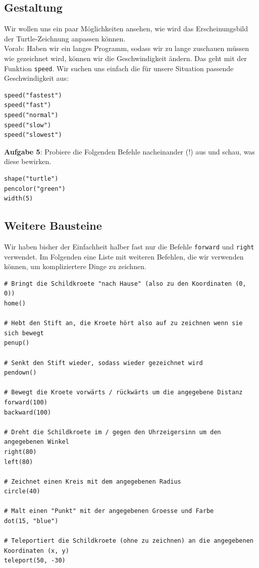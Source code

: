 \documentclass[ngerman,11pt]{article}
\begin{document}
    \subsection{Gestaltung}

    Wir wollen uns ein paar Möglichkeiten ansehen, wie wird das Erscheinungsbild
    der Turtle-Zeichnung anpassen können. \\

    Vorab: Haben wir ein langes Programm, sodass wir zu lange zuschauen müssen wie gezeichnet wird,
    können wir die Geschwindigkeit ändern.
    Das geht mit der Funktion \verb_speed_.
    Wir suchen uns einfach die für unsere Situation passende Geschwindigkeit aus:

    \begin{lstlisting}[caption=Geschwindigkeit ändern]
speed("fastest")
speed("fast")
speed("normal")
speed("slow")
speed("slowest")
    \end{lstlisting}

    \textbf{Aufgabe 5}: Probiere die Folgenden Befehle nacheinander (!) aus und schau, was diese bewirken.

    \begin{lstlisting}[caption=Erscheinungsbild]
shape("turtle")
pencolor("green")
width(5)
    \end{lstlisting}

    \subsection{Weitere Bausteine}

    Wir haben bisher der Einfachheit halber fast nur die Befehle \verb_forward_ und \verb_right_
    verwendet.
    Im Folgenden eine Liste mit weiteren Befehlen, die wir verwenden können, um kompliziertere Dinge zu zeichnen.

    \begin{lstlisting}[Turtle Befehle - Übersicht]
# Bringt die Schildkroete "nach Hause" (also zu den Koordinaten (0, 0))
home()

# Hebt den Stift an, die Kroete hört also auf zu zeichnen wenn sie sich bewegt
penup()

# Senkt den Stift wieder, sodass wieder gezeichnet wird
pendown()

# Bewegt die Kroete vorwärts / rückwärts um die angegebene Distanz
forward(100)
backward(100)

# Dreht die Schildkroete im / gegen den Uhrzeigersinn um den angegebenen Winkel
right(80)
left(80)

# Zeichnet einen Kreis mit dem angegebenen Radius
circle(40)

# Malt einen "Punkt" mit der angegebenen Groesse und Farbe
dot(15, "blue")

# Teleportiert die Schildkroete (ohne zu zeichnen) an die angegebenen Koordinaten (x, y)
teleport(50, -30)
    \end{lstlisting}
\end{document}
